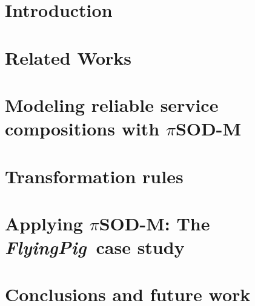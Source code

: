 \documentclass{ws-ijseke}
\newcommand{\pisodm}[0]{$\pi$SOD-M\xspace}
\def\FlyingPig{\textsl{FlyingPig}\xspace}
\begin{document}
\begin{abstract}
Specifying non-functional requirements (NFRs) is a complex task, being usually dealt with on the later phases of the software process.
The late inclusion of NFRs in the development may compromise the quality of the deployed application.
This paper presents \pisodm, a method and associated tools that
\textit{(i)}  allows the early specification of non-functional requirements in a principled way: users are abstracted away from low level details;
\textit{(ii)} embraces the MDA philosophy, generating models (code) whenever possible.
The pro\-po\-sed solution has been utilized in the context of an industrial and real case study.
\end{abstract}



\section{Introduction}
\label{sec:intro}


\section{Related Works}
\label{sec:relworks}


\section{Modeling reliable service compositions with \pisodm}\label{sec:motivation}


\section{Transformation rules}\label{sec:mmrules}


\section{Applying \pisodm: The \FlyingPig\ case study}
\label{sec:flyingPig}



\section{Conclusions and future work}\label{sec:conclusions}





\end{document}
